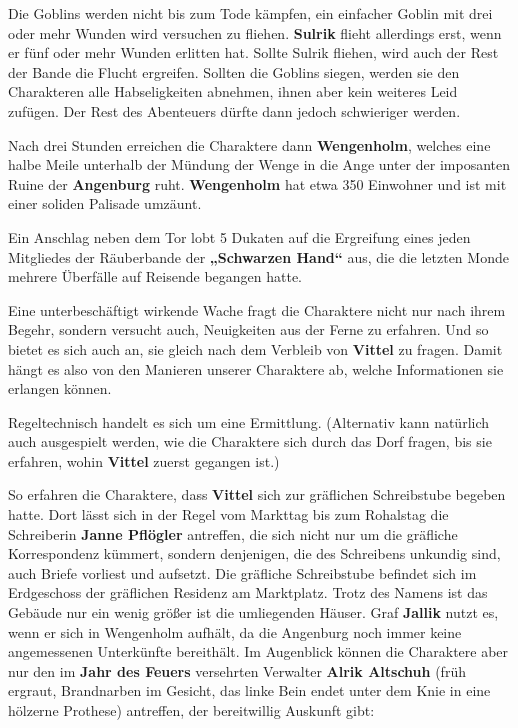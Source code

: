 Die Goblins werden nicht bis zum Tode kämpfen, ein einfacher Goblin mit drei oder mehr Wunden wird versuchen zu fliehen.
\textbf{Sulrik} flieht  allerdings erst, wenn er fünf oder mehr Wunden erlitten hat.
Sollte Sulrik fliehen, wird auch der Rest der Bande die Flucht ergreifen.
Sollten die Goblins siegen, werden sie den Charakteren alle Habseligkeiten abnehmen, ihnen aber kein weiteres Leid zufügen.
Der Rest des Abenteuers dürfte dann jedoch schwieriger werden. 
%
%
%



Nach drei Stunden erreichen die Charaktere dann \textbf{Wengenholm}, welches eine halbe Meile unterhalb der Mündung der Wenge in die Ange unter der imposanten Ruine der \textbf{Angenburg} ruht.
\textbf{Wengenholm} hat etwa 350 Einwohner und ist mit einer soliden Palisade umzäunt.
	
	Ein Anschlag neben dem Tor lobt 5 Dukaten auf die Ergreifung eines jeden Mitgliedes der Räuberbande der \textbf{„Schwarzen Hand“} aus, die die letzten Monde mehrere Überfälle auf Reisende begangen hatte.
	
	Eine unterbeschäftigt wirkende Wache fragt die Charaktere nicht nur nach ihrem Begehr, sondern versucht auch, Neuigkeiten aus der Ferne zu erfahren.
	Und so bietet es sich auch an, sie gleich nach dem Verbleib von \textbf{Vittel} zu fragen.
	Damit hängt es also von den Manieren unserer Charaktere ab, welche Informationen sie erlangen können. 

Regeltechnisch handelt es sich um eine Ermittlung.
(Alternativ kann natürlich auch ausgespielt werden, wie die Charaktere sich durch das Dorf fragen, bis sie erfahren, wohin \textbf{Vittel} zuerst gegangen ist.)



So erfahren die Charaktere, dass \textbf{Vittel} sich zur gräflichen Schreibstube begeben hatte.
Dort lässt sich in der Regel vom Markttag bis zum Rohalstag die Schreiberin \textbf{Janne Pflögler} antreffen, die sich nicht nur um die gräfliche Korrespondenz kümmert, sondern denjenigen, die des Schreibens unkundig sind, auch Briefe vorliest und aufsetzt.
Die gräfliche Schreibstube befindet sich im Erdgeschoss der gräflichen Residenz am Marktplatz.
Trotz des Namens ist das Gebäude nur ein wenig größer ist die umliegenden Häuser.
Graf \textbf{Jallik} nutzt es, wenn er sich in Wengenholm aufhält, da die Angenburg noch immer keine angemessenen Unterkünfte bereithält.
Im Augenblick können die Charaktere aber nur den im \textbf{Jahr des Feuers} versehrten Verwalter \textbf{Alrik Altschuh} (früh ergraut, Brandnarben im Gesicht, das linke Bein endet unter dem Knie in eine hölzerne Prothese) antreffen, der bereitwillig Auskunft gibt:

